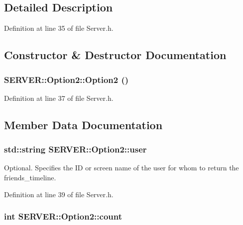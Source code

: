 \subsection{Detailed Description}


Definition at line 35 of file Server.h.

\subsection{Constructor \& Destructor Documentation}
\hypertarget{structSERVER_1_1Option2_d97991e3af57fa03d4763ff00fee831c}{
\subsubsection{\setlength{\rightskip}{0pt plus 5cm}SERVER::Option2::Option2 ()}}
\label{structSERVER_1_1Option2_d97991e3af57fa03d4763ff00fee831c}




Definition at line 37 of file Server.h.

\subsection{Member Data Documentation}
\hypertarget{structSERVER_1_1Option2_cc4ff418bf1cb85987457878ecf58840}{
\subsubsection{\setlength{\rightskip}{0pt plus 5cm}std::string {\bf SERVER::Option2::user}}}
\label{structSERVER_1_1Option2_cc4ff418bf1cb85987457878ecf58840}


Optional. Specifies the ID or screen name of the user for whom to return the friends\_\-timeline. 



Definition at line 39 of file Server.h.\hypertarget{structSERVER_1_1Option2_49cccf8e4da75bacccc85eb3ea4257e7}{
\subsubsection{\setlength{\rightskip}{0pt plus 5cm}int {\bf SERVER::Option2::count}}}
\label{structSERVER_1_1Option2_49cccf8e4da75bacccc85eb3ea4257e7}


